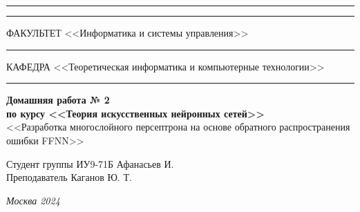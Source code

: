 \documentclass[a4paper, 14pt]{extarticle}
\begin{document}
\begin{titlepage}
\vspace{-25pt}
\hspace{-35pt}\rule{\textwidth}{2.3pt}

\vspace*{-20.3pt}
\hspace{-35pt}\rule{\textwidth}{0.4pt}

\vspace{1.5ex}
\hspace{-35pt} \noindent \small ФАКУЛЬТЕТ\hspace{80pt} <<Информатика и системы управления>>

\vspace*{-16pt}
\hspace{47pt}\rule{0.83\textwidth}{0.4pt}

\vspace{0.5ex}
\hspace{-35pt} \noindent \small КАФЕДРА\hspace{50pt} <<Теоретическая информатика и компьютерные технологии>>

\vspace*{-16pt}
\hspace{30pt}\rule{0.866\textwidth}{0.4pt}
  
\vspace{11em}

\begin{center}
\Large {\bf Домашняя работа № 2} \\ 
\large {\bf по курсу <<Теория искусственных нейронных сетей>>} \\
\large <<Разработка многослойного персептрона на основе обратного распространения ошибки FFNN>> 
\end{center}\normalsize

\vspace{8em}


\begin{flushright}
  {Студент группы ИУ9-71Б Афанасьев И. \hspace*{15pt}\\ 
  \vspace{2ex}
  Преподаватель Каганов Ю. Т.\hspace*{15pt}}
\end{flushright}

\bigskip

\vfill
 

\begin{center}
\textsl{Москва 2024}
\end{center}
\end{titlepage}
\end{document}
